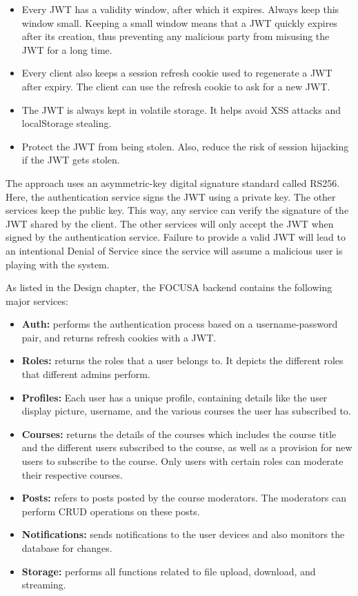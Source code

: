 \begin{itemize}
    \item Every JWT has a validity window, after which it expires. Always keep this window small. 
    Keeping a small window means that a JWT quickly expires after its creation, thus preventing any malicious party from misusing the JWT for a long time.
    \item Every client also keeps a session refresh cookie used to regenerate a JWT after expiry. The client can use the refresh cookie to ask for a new JWT.
    \item The JWT is always kept in volatile storage. It helps avoid XSS attacks and localStorage stealing.
    \item Protect the JWT from being stolen. Also, reduce the risk of session hijacking if the JWT gets stolen.
\end{itemize}

The approach uses an asymmetric-key digital signature standard called RS256. Here, the authentication service signs the JWT using a private key. The other services keep the public key. This way, any service can verify the signature of the JWT shared by the client. The other services will only accept the JWT when signed by the authentication service. 
Failure to provide a valid JWT will lead to an intentional Denial of Service since the service will assume a malicious user is playing with the system.

As listed in the Design chapter, the FOCUSA backend contains the following major services:
\begin{itemize}
    \item \textbf{Auth:} performs the authentication process based on a username-password pair, and returns refresh cookies with a JWT.
    \item \textbf{Roles:}  returns the roles that a user belongs to. It depicts the different roles that different admins perform.
    \item \textbf{Profiles:} Each user has a unique profile, containing details like the user display picture, username, and the various courses the user has subscribed to.
    \item \textbf{Courses:}  returns the details of the courses which includes the course title and the different users subscribed to the course, as well as a provision for new users to subscribe to the course. Only users with certain roles can moderate their respective courses.
    \item \textbf{Posts:} refers to posts posted by the course moderators. The moderators can perform CRUD operations on these posts.
    \item \textbf{Notifications:}  sends notifications to the user devices and also monitors the database for changes.
    \item \textbf{Storage:} performs all functions related to file upload, download, and streaming.
\end{itemize}

